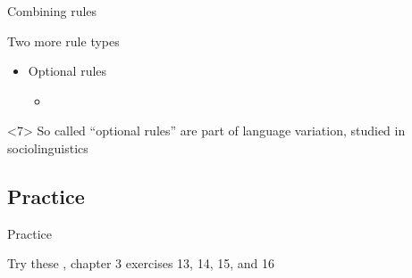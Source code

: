 \documentclass{beamer}
\newcommand{\subonefour}{Combining rules}
\newcommand{\subonesix}{Practice}
\begin{document}
\begin{frame}{\subonefour}
{\begin{block}{Two more rule types}
\begin{itemize}
\begin{itemize}
              \end{itemize}
              \item \alert{Optional rules}
              \begin{itemize}
                \item<6-> 
              \end{itemize}
            \end{itemize}
          \end{block}
          \begin{alertblock}<7>{}
            So called ``optional rules'' are part of language variation, studied in sociolinguistics
          \end{alertblock}
        }
      \end{frame}

    \subsection{\subonesix}
      \begin{frame}{\subonesix}
        \begin{block}{Try these}
          \textcite{dawson_language_2016}, chapter 3 exercises 13, 14, 15, and 16
        \end{block}
      \end{frame}
  
\end{document}
